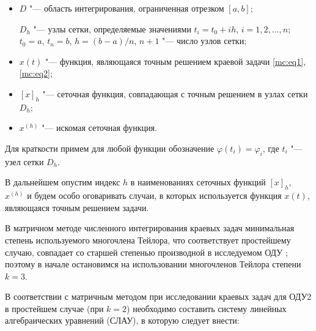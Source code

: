 \begin{itemize}

\item[1)] $D$ "--- область интегрирования, ограниченная отрезком $[a,  b]$; 

 $D_h$ "--- узлы сетки, определяемые значениями $t_i=t_0+ih$, $i=1,  2,  \dots,  n$; $t_0=a$, $t_n=b$, $h=(b-a)/n$, $n+1$ "--- число узлов сетки;



\item[2)] $x(t)$ "--- функция, являющаяся точным решением краевой задачи \eqref{mc:eq1}, \eqref{mc:eq2};



\item[3)]  $[x]_h$ "--- сеточная функция, совпадающая с точным решением в узлах сетки $D_h$;



\item[4)] $x^{(h)}$ "--- искомая сеточная функция.



\end{itemize}





Для краткости примем для любой функции обозначение $\varphi(t_i)=\varphi_i$, где $t_i$ "--- узел сетки $D_h$.



В дальнейшем опустим индекс $h$  в наименованиях сеточных функций $[x]_h$, $x^{(h)}$ и будем особо оговаривать  случаи, в которых используется функция $x(t)$, являющаяся точным решением задачи.%



\smallskip




В  матричном методе  численного интегрирования краевых задач минимальная степень используемого многочлена Тейлора, что соответствует простейшему случаю, совпадает со старшей степенью производной в исследуемом ОДУ \cite{mc:bib1}; поэтому в начале остановимся на использовании многочленов Тейлора степени $k=3$.



В соответствии с матричным методом \cite{mc:bib1} при исследовании краевых задач для ОДУ2 в простейшем случае (при $k=2$) необходимо составить систему линейных алгебраических уравнений (СЛАУ), в которую следует внести:



